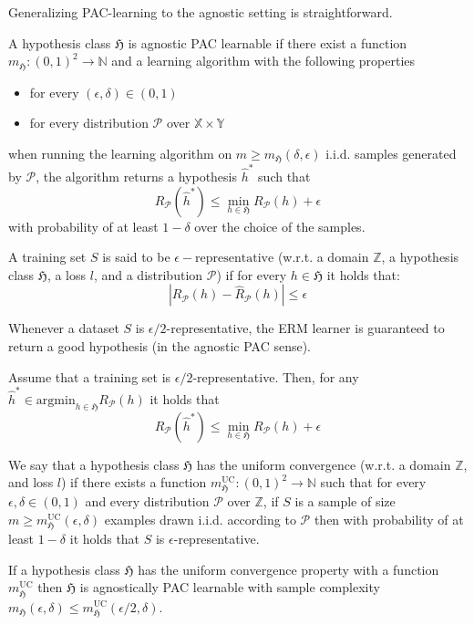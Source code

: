 Generalizing PAC-learning to the agnostic setting is straightforward.
\begin{definition}
	A hypothesis class $\mathfrak{H}$ is agnostic PAC learnable if there exist a
	function $m_\mathfrak{H}: (0,1)^2 \to \mathbb{N}$ and a learning
	algorithm with the following properties
	\begin{itemize}
		\item for every $(\epsilon, \delta) \in (0,1)$
		\item for every distribution $\mathcal{P}$ over $\mathbb{X} \times \mathbb{Y}$
	\end{itemize}
when running the learning
	algorithm on $m \geq m_\mathfrak{H}(\delta, \epsilon)$ i.i.d. samples
	generated by $\mathcal{P}$, the algorithm returns a
	hypothesis $\hat{h}^*$ such that 
	$$
	R_\mathcal{P}(\hat{h}^*) \leq \min_{h \in \mathfrak{H}} R_\mathcal{P}(h) +  \epsilon
	$$ 
	with probability of at least $1-\delta$ over the choice of the samples.
\end{definition}
\begin{definition}
	A training set $S$ is said to be $\epsilon-\text{representative}$
	(w.r.t. a domain $\mathbb{Z}$, a hypothesis class $\mathfrak{H}$, a
	loss $l$, and a distribution $\mathcal{P}$) if for every $h \in
	\mathfrak{H}$ it holds that:
	$$
	|R_\mathcal{P}(h) - \hat{R}_\mathcal{P}(h)| \leq \epsilon
	$$
\end{definition}
Whenever a dataset $S$ is $\epsilon/2$-representative, the ERM learner is
guaranteed to return a good hypothesis (in the agnostic PAC sense).
\begin{thm}
Assume that a training set is $\epsilon/2$-representative. Then, for any
$\hat{h}^* \in \text{argmin}_{h\in \mathfrak{H}} R_{\mathcal{P}}(h)$ it holds that	
$$
R_\mathcal{P}(\hat{h}^*) \leq \min_{h\in \mathfrak{H}} R_\mathcal{P}(h) +\epsilon
$$ 
\end{thm}
\begin{definition}
	We say that a hypothesis class $\mathfrak{H}$ has the uniform convergence
	(w.r.t. a domain $\mathbb{Z}$, and loss $l$) if there exists a function
	$m_\mathfrak{H}^{\text{UC}}:(0,1)^2 \to \mathbb{N}$ such that for every
	$\epsilon, \delta \in (0,1)$ and every distribution $\mathcal{P}$ over
	$\mathbb{Z}$, if $S$ is a sample of size $m \geq
	m_\mathfrak{H}^{\text{UC}}(\epsilon, \delta)$ examples drawn i.i.d.
	according to $\mathcal{P}$ then with probability of at
	least $1-\delta$ it holds that $S$ is $\epsilon$-representative.
\end{definition}	
\begin{coro}
If a hypothesis class $\mathfrak{H}$ has the uniform convergence property with a
function $m_\mathfrak{H}^{\text{UC}}$ then $\mathfrak{H}$ is agnostically PAC
learnable with sample complexity $m_\mathfrak{H}(\epsilon, \delta) \leq
m_\mathfrak{H}^{\text{UC}}(\epsilon/2, \delta)$.
\end{coro}
